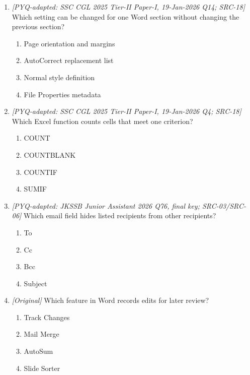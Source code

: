 \begin{enumerate}[label=\textbf{Q\arabic*.}, leftmargin=*]
\begin{enumerate}[label=\Alph*.]
    \item I and II only
    \item III only
    \item I, II, and III
    \item II and III only
  \end{enumerate}
\item \textit{[PYQ-adapted: SSC CGL 2025 Tier-II Paper-I, 19-Jan-2026 Q14; SRC-18]} Which setting can be changed for one Word section without changing the previous section?
  \begin{enumerate}[label=\Alph*.]
\item Page orientation and margins
   \item AutoCorrect replacement list
   \item Normal style definition
   \item File Properties metadata
  \end{enumerate}

\item \textit{[PYQ-adapted: SSC CGL 2025 Tier-II Paper-I, 19-Jan-2026 Q4; SRC-18]} Which Excel function counts cells that meet one criterion?
  \begin{enumerate}[label=\Alph*.]
\item COUNT
   \item COUNTBLANK
   \item COUNTIF
   \item SUMIF
  \end{enumerate}

\item \textit{[PYQ-adapted: JKSSB Junior Assistant 2026 Q76, final key; SRC-03/SRC-06]} Which email field hides listed recipients from other recipients?
  \begin{enumerate}[label=\Alph*.]
\item To
   \item Cc
   \item Bcc
   \item Subject
  \end{enumerate}

\item \textit{[Original]} Which feature in Word records edits for later review?
  \begin{enumerate}[label=\Alph*.]
\item Track Changes
   \item Mail Merge
   \item AutoSum
   \item Slide Sorter
  \end{enumerate}


\end{enumerate}

